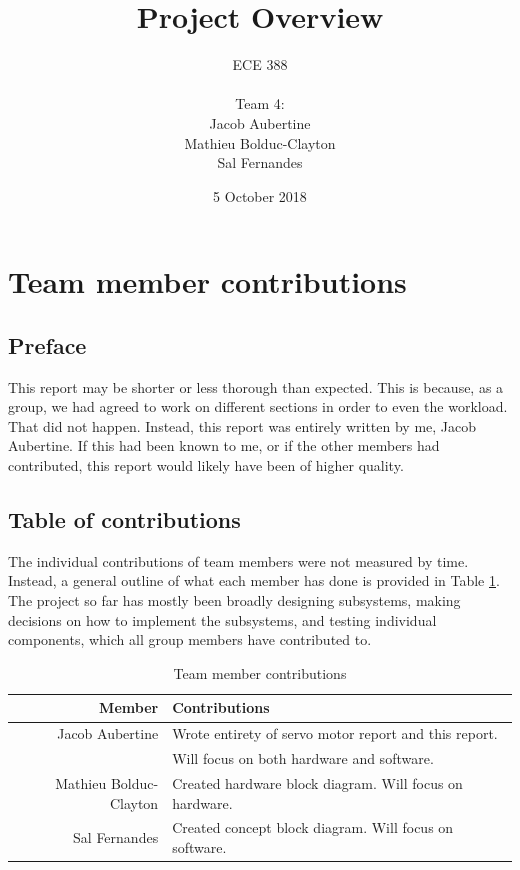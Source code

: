 \documentclass{article}
\title{Project Overview}
\date{5 October 2018}
\author{
	ECE 388
	\\
	\\
	Team 4:
	\\
	Jacob Aubertine
	\\
	Mathieu Bolduc-Clayton
	\\
	Sal Fernandes
}
\begin{document}
	\maketitle
	\newpage
	\tableofcontents
	\newpage

    \section{Team member contributions}
	    \subsection{Preface}
	    This report may be shorter or less thorough than expected. This is because, as a group, we had agreed to work on different sections in order to even the workload. That did not happen. Instead, this report was entirely written by me, Jacob Aubertine. If this had been known to me, or if the other members had contributed, this report would likely have been of higher quality.
	    
	    \subsection{Table of contributions}
	    The individual contributions of team members were not measured by time. Instead, a general outline of what each member has done is provided in Table \ref{tab:table1}. The project so far has mostly been broadly designing subsystems, making decisions on how to implement the subsystems, and testing individual components, which all group members have contributed to.
	    \begin{table}[h!]
  	    \begin{center}
            \caption{Team member contributions}
    		\label{tab:table1}
    		\begin{tabular}{r|l}
      			\textbf{Member} & \textbf{Contributions} \\
			    \hline
      			Jacob Aubertine & Wrote entirety of servo motor report and this report.\\
      			 & Will focus on both hardware and software. \\
      			Mathieu Bolduc-Clayton & Created hardware block diagram. Will focus on hardware.\\
      			Sal Fernandes & Created concept block diagram. Will focus on software.\\
   			\end{tabular}
  	    \end{center}
	\end{table}
\end{document}
